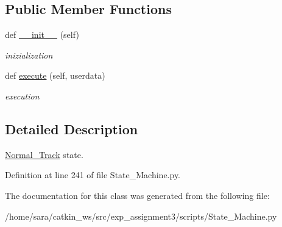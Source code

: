 \subsection*{Public Member Functions}
\begin{DoxyCompactItemize}
\item 
\mbox{\label{classState__Machine_1_1Normal__Track_abe253cd840c44ccd24ad680b1092422c}} 
def \hyperlink{classState__Machine_1_1Normal__Track_abe253cd840c44ccd24ad680b1092422c}{\+\_\+\+\_\+init\+\_\+\+\_\+} (self)
\begin{DoxyCompactList}\small\item\em inizialization \end{DoxyCompactList}\item 
\mbox{\label{classState__Machine_1_1Normal__Track_a4878aa8a2963079bcab7fc838d498dc3}} 
def \hyperlink{classState__Machine_1_1Normal__Track_a4878aa8a2963079bcab7fc838d498dc3}{execute} (self, userdata)
\begin{DoxyCompactList}\small\item\em execution \end{DoxyCompactList}\end{DoxyCompactItemize}


\subsection{Detailed Description}
\hyperlink{classState__Machine_1_1Normal__Track}{Normal\+\_\+\+Track} state. 

Definition at line 241 of file State\+\_\+\+Machine.\+py.



The documentation for this class was generated from the following file\+:\begin{DoxyCompactItemize}
\item 
/home/sara/catkin\+\_\+ws/src/exp\+\_\+assignment3/scripts/State\+\_\+\+Machine.\+py\end{DoxyCompactItemize}
